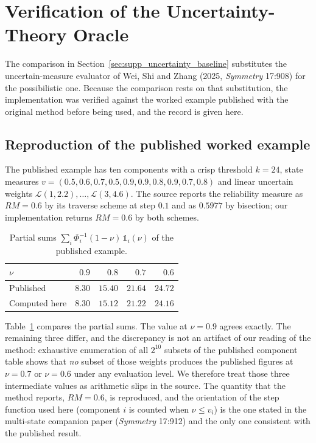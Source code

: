 \documentclass[11pt]{article}
\begin{document}
\section{Verification of the Uncertainty-Theory Oracle} \label{sec:supp_oracle}

The comparison in Section~\ref{sec:supp_uncertainty_baseline} substitutes the uncertain-measure evaluator of Wei,
Shi and Zhang (2025, \emph{Symmetry} 17:908) for the possibilistic one. Because the comparison rests on that substitution, the implementation was verified against the worked example
published with the original method before being used, and the record is given here.

\subsection{Reproduction of the published worked example}

The published example has ten components with a crisp threshold $k=24$, state measures
$v=(0.5,0.6,0.7,0.5,0.9,0.9,0.8,0.9,0.7,0.8)$ and linear uncertain weights
$\mathcal{L}(1,2.2),\dots,\mathcal{L}(3,4.6)$. The source reports the reliability measure as
$RM=0.6$ by its traverse scheme at step $0.1$ and as $0.5977$ by bisection; our implementation returns
$RM=0.6$ by both schemes.

\begin{table}[htbp]
\centering
\caption{Partial sums $\sum_i \Phi_i^{-1}(1-\nu)\,\mathbb{1}_i(\nu)$ of the published example.}
\label{tab:supp_oracle_sums}
\begin{tabular}{lrrrr}
\toprule
$\nu$ & $0.9$ & $0.8$ & $0.7$ & $0.6$\\
\midrule
Published & $8.30$ & $15.40$ & $21.64$ & $24.72$\\
Computed here & $8.30$ & $15.12$ & $21.22$ & $24.16$\\
\bottomrule
\end{tabular}
\end{table}

Table~\ref{tab:supp_oracle_sums} compares the partial sums. The value at $\nu=0.9$ agrees exactly. The remaining three differ, and the discrepancy is not an
artifact of our reading of the method: exhaustive enumeration of all $2^{10}$ subsets of the published
component table shows that \emph{no} subset of those weights produces the published figures at
$\nu=0.7$ or $\nu=0.6$ under any evaluation level. We therefore treat those three intermediate values
as arithmetic slips in the source. The quantity that the method reports, $RM=0.6$, is reproduced, and
the orientation of the step function used here (component $i$ is counted when $\nu \le v_i$) is
the one stated in the multi-state companion paper (\emph{Symmetry} 17:912) and the only one consistent
with the published result.
\end{document}
